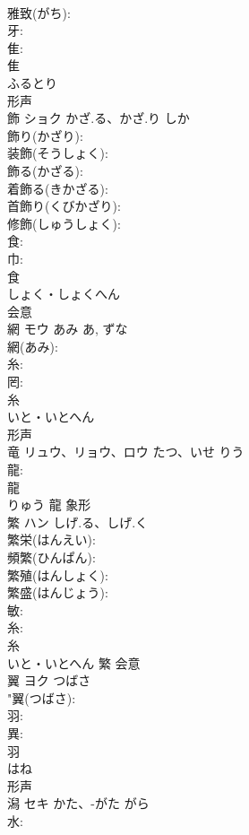 \documentclass[8pt]{extreport}
\begin{document}
\begin{CJK}{UTF8}{min}
\\	雅致(がち): 
\\	牙: 
\\	隹: 
\\	隹	
\\	ふるとり	
\\	形声 
\\	飾	ショク	かざ.る、かざ.り	しか	
\\	飾り(かざり): 
\\	装飾(そうしょく): 
\\	飾る(かざる): 
\\	着飾る(きかざる): 
\\	首飾り(くびかざり): 
\\	修飾(しゅうしょく): 
\\	食: 
\\	巾: 
\\	食	
\\	しょく・しょくへん	
\\	会意 
\\	網	モウ	あみ	あ, ずな	
\\	網(あみ): 
\\	糸: 
\\	罔: 
\\	糸	
\\	いと・いとへん	
\\	形声 
\\	竜	リュウ、リョウ、ロウ	たつ、いせ	りう	
\\	龍: 
\\	龍	
\\	りゅう	龍	象形 
\\	繁	ハン	しげ.る、しげ.く		
\\	繁栄(はんえい): 
\\	頻繁(ひんぱん): 
\\	繁殖(はんしょく): 
\\	繁盛(はんじょう): 
\\	敏: 
\\	糸: 
\\	糸	
\\	いと・いとへん	繁	会意 
\\	翼	ヨク	つばさ		
\\	"翼(つばさ): 
\\	羽: 
\\	異: 
\\	羽	
\\	はね	
\\	形声 
\\	潟	セキ	かた、-がた	がら	
\\	水: 

\end{CJK}
\end{document}
